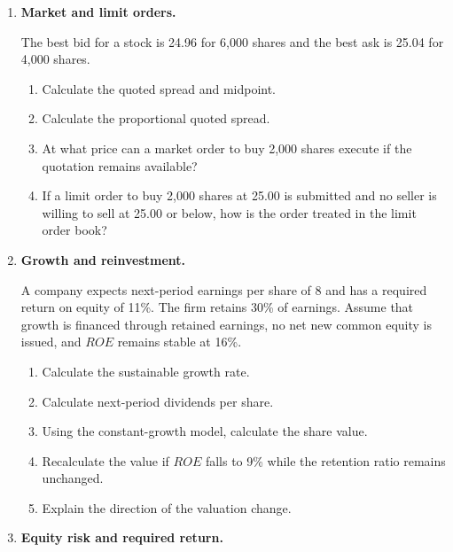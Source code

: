 \begin{enumerate}
\begin{enumerate}
\end{enumerate}

\item \textbf{Market and limit orders.}

The best bid for a stock is 24.96 for 6,000 shares and the best ask is 25.04 for 4,000 shares.

\begin{enumerate}

\item Calculate the quoted spread and midpoint.

\item Calculate the proportional quoted spread.

\item At what price can a market order to buy 2,000 shares execute if the quotation remains available?

\item If a limit order to buy 2,000 shares at 25.00 is submitted and no seller is willing to sell at 25.00 or below, how is the order treated in the limit order book?

\end{enumerate}

\item \textbf{Growth and reinvestment.}

A company expects next-period earnings per share of 8 and has a required return on equity of 11\%. The firm retains 30\% of earnings. Assume that growth is financed through retained earnings, no net new common equity is issued, and \(ROE\) remains stable at 16\%.

\begin{enumerate}

\item Calculate the sustainable growth rate.

\item Calculate next-period dividends per share.

\item Using the constant-growth model, calculate the share value.

\item Recalculate the value if \(ROE\) falls to 9\% while the retention ratio remains unchanged.

\item Explain the direction of the valuation change.

\end{enumerate}

\item \textbf{Equity risk and required return.}


\end{enumerate}
